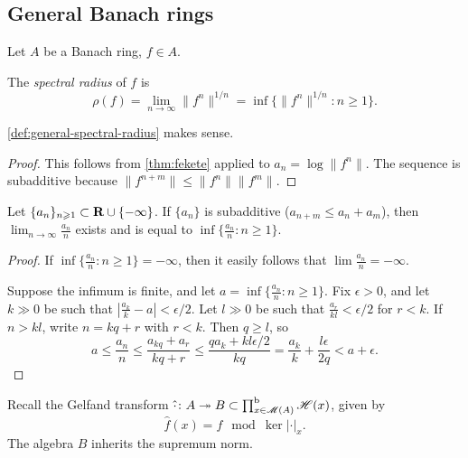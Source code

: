 \subsection{General Banach rings}

Let $A$ be a Banach ring, $f\in A$. 

\begin{definition}\label{def:general-spectral-radius}
The \emph{spectral radius} of $f$ is 
\[
  \rho(f) = \lim_{n\to \infty} \|f^n\|^{1/n} = \inf\{\|f^n\|^{1/n}\colon n\geqslant 1\} .
\]
\end{definition}

\begin{lemma}
\autoref{def:general-spectral-radius} makes sense. 
\end{lemma}
\begin{proof}
This follows from \autoref{thm:fekete} applied to $a_n=\log\|f^n\|$. The 
sequence is subadditive because $\|f^{n+m}\| \leqslant \|f^n\| \|f^m\|$.
\end{proof}

\begin{theorem}[Fekete]\label{thm:fekete}
Let $\{a_n\}_{n\geqslant 1}\subset \mathbf{R}\cup\{-\infty\}$. If $\{a_n\}$ is 
subadditive ($a_{n+m}\leqslant a_n+a_m$), then 
$\lim_{n\to \infty} \frac{a_n}{n}$ exists and is equal to 
$\inf\{\frac{a_n}{n}\colon n\geqslant 1\}$. 
\end{theorem}
\begin{proof}
If $\inf\{\frac{a_n}{n}\colon n\geqslant 1\}=-\infty$, then it easily follows 
that $\lim \frac{a_n}{n}=-\infty$. 

Suppose the infimum is finite, and let 
$a=\inf\{\frac{a_n}{n}\colon n\geqslant 1\}$. Fix $\epsilon>0$, and let 
$k\gg 0$ be such that $\left|\frac{a_k}{k}-a\right|<\epsilon/2$. Let $l\gg 0$ 
be such that $\frac{a_r}{kl}<\epsilon/2$ for $r<k$. If $n>k l$, write  
$n=kq+r$ with $r<k$. Then $q\geqslant l$, so 
\[
  a \leqslant \frac{a_n}{n} \leqslant \frac{a_{kq}+a_r}{kq+r} \leqslant \frac{q a_k + kl\epsilon/2}{kq} = \frac{a_k}{k} + \frac{l\epsilon}{2q} < a+\epsilon .
\]
\end{proof}

Recall the Gelfand transform 
$\hat\cdot\colon A\twoheadrightarrow B\subset \prod^\mathrm{b}_{x\in \operatorname{\mathscr{M}}(A)} \mathscr{H}(x)$, given by 
\[
  \hat f(x) = f\mod{\ker|\cdot|_x} .
\]
The algebra $B$ inherits the supremum norm.  

